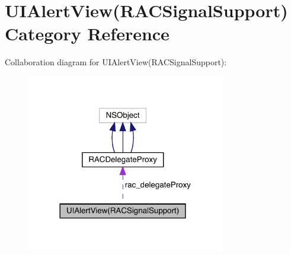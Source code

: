 \hypertarget{category_u_i_alert_view_07_r_a_c_signal_support_08}{}\section{U\+I\+Alert\+View(R\+A\+C\+Signal\+Support) Category Reference}
\label{category_u_i_alert_view_07_r_a_c_signal_support_08}


Collaboration diagram for U\+I\+Alert\+View(R\+A\+C\+Signal\+Support)\+:\nopagebreak
\begin{figure}[H]
\begin{center}
\leavevmode
\includegraphics[width=245pt]{category_u_i_alert_view_07_r_a_c_signal_support_08__coll__graph}
\end{center}
\end{figure}
